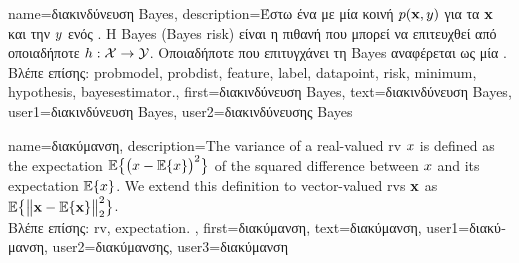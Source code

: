 {name={\foreignlanguage{greek}{διακινδύνευση} Bayes},
	description={\foreignlanguage{greek}{Έστω ένα}  \foreignlanguage{greek}{με μία κοινή}  
		$p({\bf x},y)$ \foreignlanguage{greek}{για τα}  ${\bf x}$ 
		\foreignlanguage{greek}{και την}  $y$ \foreignlanguage{greek}{ενός} . 
		\foreignlanguage{greek}{Η}  Bayes (Bayes risk)
		\foreignlanguage{greek}{είναι η}  \foreignlanguage{greek}{πιθανή}  \foreignlanguage{greek}{που μπορεί 
		να επιτευχθεί από οποιαδήποτε}  
		$h: \mathcal{X} \rightarrow \mathcal{Y}$. \foreignlanguage{greek}{Οποιαδήποτε}  \foreignlanguage{greek}{που 
		επιτυγχάνει τη}  Bayes \foreignlanguage{greek}{αναφέρεται ως μία}  \cite{LC}.\\
	\foreignlanguage{greek}{Βλέπε επίσης:} \gls{probmodel}, \gls{probdist}, \gls{feature}, \gls{label}, \gls{datapoint}, \gls{risk}, \gls{minimum}, \gls{hypothesis}, \gls{bayesestimator}.},
first={\foreignlanguage{greek}{διακινδύνευση} Bayes},
text={\foreignlanguage{greek}{διακινδύνευση} Bayes},
user1={\foreignlanguage{greek}{διακινδύνευση} Bayes}, %
user2={\foreignlanguage{greek}{διακινδύνευσης} Bayes} %
}

{name={\foreignlanguage{greek}{διακύμανση}},
	description={The variance of a real-valued \gls{rv} $x$ is defined as the \gls{expectation} 
		$\mathbb{E}\big\{ \big( x - \mathbb{E}\{x \} \big)^{2} \big\}$ of the squared difference between $x$ 
		and its \gls{expectation} $\mathbb{E}\{x \}$. We extend this definition to vector-valued \gls{rv}s ${\bf x}$ 
		as $\mathbb{E}\big\{ \big\| {\bf x} - \mathbb{E}\{{\bf x} \} \big\|_{2}^{2} \big\}$.\\
		\foreignlanguage{greek}{Βλέπε επίσης:} \gls{rv}, \gls{expectation}.} ,
		first={\foreignlanguage{greek}{διακύμανση}},
		text={\foreignlanguage{greek}{διακύμανση}},
		user1={\foreignlanguage{greek}{διακύμανση}}, %
   		user2={\foreignlanguage{greek}{διακύμανσης}}, %
		user3={\foreignlanguage{greek}{διακύμανση}} %
}

